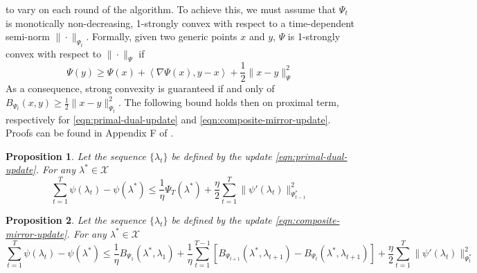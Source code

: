 \documentclass[notitlepage]{article}
\newtheorem{proposition}{Proposition}[section]
\begin{document}
to vary on each round of the algorithm. To achieve this, we must assume that $\Psi_t$ is monotically non-decreasing, 1-strongly convex with respect to a time-dependent semi-norm $\|\cdot\|_{\Psi_t}$. Formally, given two generic points $x$ and $y$, $\Psi$ is 1-strongly convex with respect 
to $\|\cdot\|_\Psi$ if
\[ \Psi(y) \ge \Psi(x) + \left\langle \nabla \Psi(x),y-x \right\rangle + \frac{1}{2} \|x-y\|_\Psi^2 \]
As a consequence, strong convexity is guaranteed if and only of $B_{\Psi_t}(x,y) \ge \frac{1}{2} \|x-y\|_{\Psi_t}^2$. The following bound holds then on proximal term, respectively for \eqref{eqn:primal-dual-update} and \eqref{eqn:composite-mirror-update}. 
Proofs can be found in Appendix F of \cite{JMLR:v12:duchi11a}.
\begin{proposition}
  Let the sequence $\{\lambda_t\}$ be defined by the update \eqref{eqn:primal-dual-update}. For any $\lambda^* \in \mathcal{X}$
  \begin{equation}
    \sum_{t=1}^T \psi(\lambda_t) - \psi(\lambda^*) \le \frac{1}{\eta} \Psi_T(\lambda^*) + \frac{\eta}{2} \sum_{t=1}^T \| \psi'(\lambda_t) \|_{\Psi_{t-1}^*}^2
  \end{equation}
\end{proposition}
\begin{proposition}
  Let the sequence $\{\lambda_t\}$ be defined by the update \eqref{eqn:composite-mirror-update}. For any $\lambda^* \in \mathcal{X}$
  \begin{equation}
    \sum_{t=1}^T \psi(\lambda_t) - \psi(\lambda^*) \le \frac{1}{\eta} B_{\Psi_1} (\lambda^*,\lambda_1) + \frac{1}{\eta} \sum_{t=1}^{T-1} \left[ B_{\Psi_{t+1}}(\lambda^*,\lambda_{t+1}) - B_{\Psi_t}(\lambda^*,\lambda_{t+1}) \right] + \frac{\eta}{2} \sum_{t=1}^T \| \psi'(\lambda_t) \|_{\Psi_t^*}^2
  \end{equation}
\end{proposition}
\end{document}
